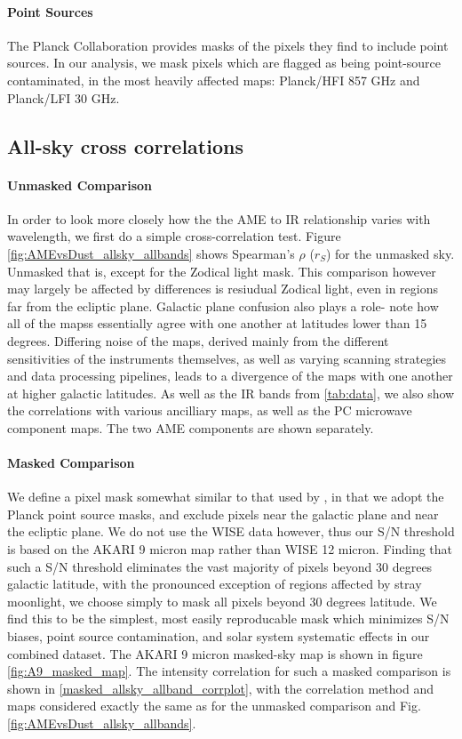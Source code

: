     \paragraph{Point Sources}
       The Planck Collaboration provides masks of the pixels they find to include point sources. In our analysis, we mask pixels which are flagged as being point-source contaminated, in the most heavily affected maps: Planck/HFI 857 GHz and Planck/LFI 30 GHz.




  \subsection{All-sky cross correlations}
    \paragraph{Unmasked Comparison}
    In order to look more closely how the the AME to IR relationship varies with wavelength, we first do a simple cross-correlation test. Figure \ref{fig:AMEvsDust_allsky_allbands} shows Spearman's $\rho$ ($r_{S}$) for the unmasked sky. Unmasked that is, except for the Zodical light mask. This comparison however may largely be affected by differences is resiudual Zodical light, even in regions far from the ecliptic plane. Galactic plane confusion also plays a role- note how all of the mapss essentially agree with one another at latitudes lower than 15 degrees. Differing noise of the maps, derived mainly from the different sensitivities of the instruments themselves, as well as varying scanning strategies and data processing pipelines, leads to a divergence of the maps with one another at higher galactic latitudes. As well as the IR bands from \ref{tab:data}, we also show the correlations with various ancilliary maps, as well as the PC microwave component maps. The two AME components are shown separately.

    \paragraph{Masked Comparison}
    We define a pixel mask somewhat similar to that used by \cite{hensley16}, in that we adopt the Planck point source masks, and exclude pixels near the galactic plane and near the ecliptic plane. We do not use the WISE data however, thus our S/N threshold is based on the AKARI 9 micron map rather than WISE 12 micron. Finding that such a S/N threshold eliminates the vast majority of pixels beyond 30 degrees galactic latitude, with the pronounced exception of regions affected by stray moonlight, we choose simply to mask all pixels beyond 30 degrees latitude. We find this to be the simplest, most easily reproducable mask which minimizes S/N biases, point source contamination, and solar system systematic effects in our combined dataset. The AKARI 9 micron masked-sky map is shown in figure \ref{fig:A9_masked_map}. The intensity correlation for such a masked comparison is shown in \ref{masked_allsky_allband_corrplot}, with the correlation method and maps considered exactly the same as for the unmasked comparison and Fig. \ref{fig:AMEvsDust_allsky_allbands}.


